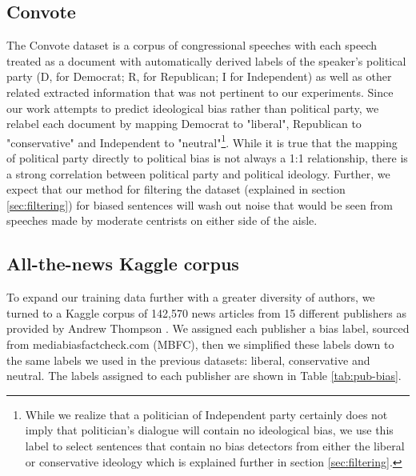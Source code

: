 \documentclass[10pt,a4paper,onecolumn]{article}
\begin{document}
\subsection{Convote}
The Convote dataset is a corpus of congressional speeches with each speech treated as a document with automatically derived labels of the speaker's political party (D, for Democrat; R, for Republican; I for Independent) as well as other related extracted information that was not pertinent to our experiments. Since our work attempts to predict ideological bias rather than political party, we relabel each document by mapping Democrat to "liberal", Republican to "conservative" and Independent to "neutral"\footnote{While we realize that a politician of Independent party certainly does not imply that politician's dialogue will contain no ideological bias, we use this label to select sentences that contain no bias detectors from either the liberal or conservative ideology which is explained further in section \ref{sec:filtering}.}. While it is true that the mapping of political party directly to political bias is not always a 1:1 relationship, there is a strong correlation between political party and political ideology. Further, we expect that our method for filtering the dataset (explained in section \ref{sec:filtering}) for biased sentences will wash out noise that would be seen from speeches made by moderate centrists on either side of the aisle.

\subsection{All-the-news Kaggle corpus}
To expand our training data further with a greater diversity of authors, we turned to a Kaggle corpus of 142,570 news articles from 15 different publishers as provided by Andrew Thompson \cite{news}. We assigned each publisher a bias label, sourced from mediabiasfactcheck.com (MBFC), then we simplified these labels down to the same labels we used in the previous datasets: liberal, conservative and neutral. The labels assigned to each publisher are shown in Table \ref{tab:pub-bias}.
\end{document}
